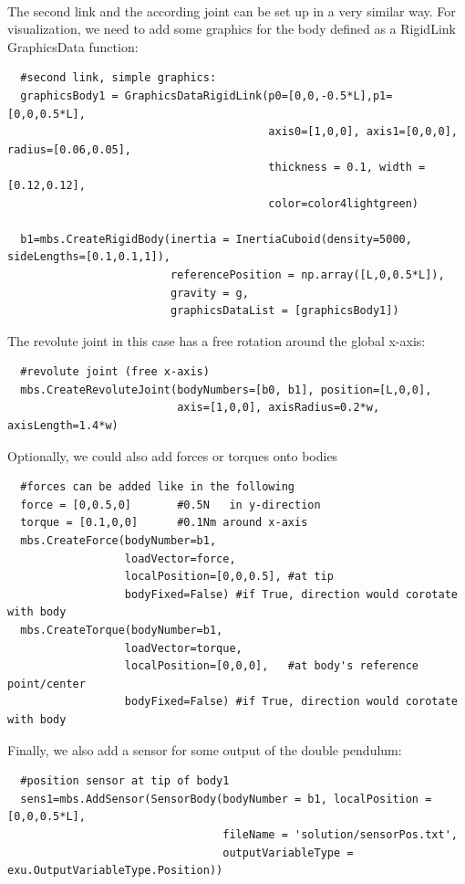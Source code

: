 \horizontalRuler\\
\noindent The second link and the according joint can be set up in a very similar way.
For visualization, we need to add some graphics for the body defined as a RigidLink GraphicsData function:
\pythonstyle\begin{lstlisting}
  #second link, simple graphics:
  graphicsBody1 = GraphicsDataRigidLink(p0=[0,0,-0.5*L],p1=[0,0,0.5*L], 
                                        axis0=[1,0,0], axis1=[0,0,0], radius=[0.06,0.05], 
                                        thickness = 0.1, width = [0.12,0.12], 
                                        color=color4lightgreen)

  b1=mbs.CreateRigidBody(inertia = InertiaCuboid(density=5000, sideLengths=[0.1,0.1,1]),
                         referencePosition = np.array([L,0,0.5*L]), 
                         gravity = g,
                         graphicsDataList = [graphicsBody1])
\end{lstlisting}

\noindent The revolute joint in this case has a free rotation around the global x-axis:
\pythonstyle\begin{lstlisting}
  #revolute joint (free x-axis)
  mbs.CreateRevoluteJoint(bodyNumbers=[b0, b1], position=[L,0,0], 
                          axis=[1,0,0], axisRadius=0.2*w, axisLength=1.4*w)
\end{lstlisting}

\noindent Optionally, we could also add forces or torques onto bodies
\pythonstyle\begin{lstlisting}
  #forces can be added like in the following
  force = [0,0.5,0]       #0.5N   in y-direction
  torque = [0.1,0,0]      #0.1Nm around x-axis
  mbs.CreateForce(bodyNumber=b1,
                  loadVector=force,
                  localPosition=[0,0,0.5], #at tip
                  bodyFixed=False) #if True, direction would corotate with body
  mbs.CreateTorque(bodyNumber=b1, 
                  loadVector=torque,
                  localPosition=[0,0,0],   #at body's reference point/center
                  bodyFixed=False) #if True, direction would corotate with body
\end{lstlisting}

\noindent Finally, we also add a sensor for some output of the double pendulum:
\pythonstyle\begin{lstlisting}
  #position sensor at tip of body1
  sens1=mbs.AddSensor(SensorBody(bodyNumber = b1, localPosition = [0,0,0.5*L],
                                 fileName = 'solution/sensorPos.txt',
                                 outputVariableType = exu.OutputVariableType.Position))
\end{lstlisting}
%

